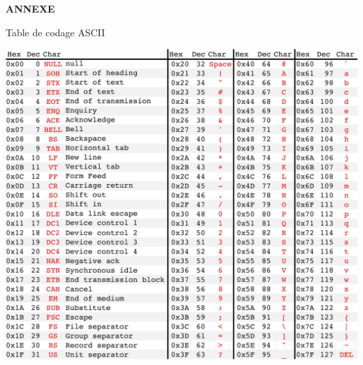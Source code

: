 \documentclass[a4paper, french, 12pt]{article}  %
\begin{document}

\begin{center}
{\Large \bfseries ANNEXE 

\label{annexe}

\bigskip

Table de codage ASCII


}


\includegraphics[width=16 cm]{images/ascii_table.jpg}


\end{center}

 
\end{document}
